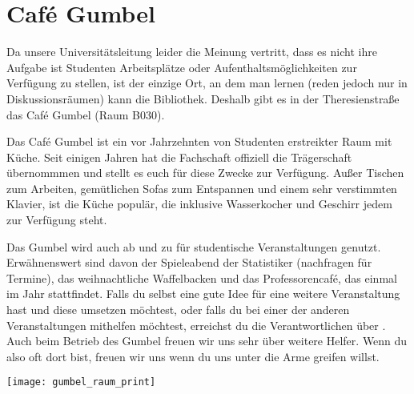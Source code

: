 ﻿
\chapter{Café Gumbel}

Da unsere Universitätsleitung leider die Meinung vertritt, dass es nicht ihre
Aufgabe ist Studenten  Arbeitsplätze oder Aufenthaltsmöglichkeiten zur Verfügung
zu stellen, ist der einzige Ort, an dem man lernen (reden jedoch nur in
Diskussionsräumen) kann die Bibliothek. Deshalb gibt es in der Theresienstraße
das Café Gumbel (Raum B030).

Das Café Gumbel ist ein vor Jahrzehnten von Studenten erstreikter Raum mit
Küche. Seit einigen Jahren hat die Fachschaft offiziell die Trägerschaft
übernommmen und stellt es euch für diese Zwecke zur Verfügung. Außer
Tischen zum Arbeiten, gemütlichen Sofas zum Entspannen und einem sehr
verstimmten Klavier, ist die Küche populär, die inklusive Wasserkocher und
Geschirr jedem zur Verfügung steht.

Das Gumbel wird auch ab und zu für studentische Veranstaltungen genutzt.
Erwähnenswert sind davon der Spieleabend der Statistiker (nachfragen für
Termine), das weihnachtliche Waffelbacken und das Professorencafé, das einmal
im Jahr stattfindet.  Falls du selbst eine gute Idee für eine weitere
Veranstaltung hast und diese umsetzen möchtest, oder falls du bei einer der anderen
Veranstaltungen mithelfen möchtest, erreichst du die Verantwortlichen über
. Auch beim Betrieb des Gumbel freuen wir uns sehr über
weitere Helfer. Wenn du also oft dort bist, freuen wir uns wenn du uns unter
die Arme greifen willst.

\skiptobottom
\texttt{[image: gumbel\_raum\_print]}
